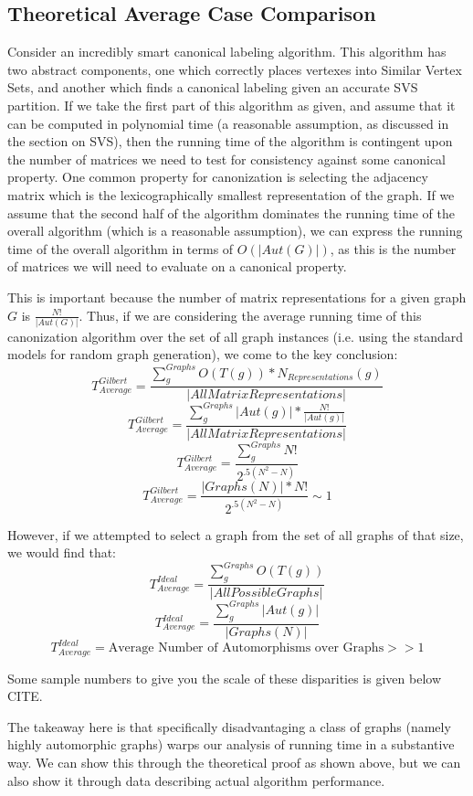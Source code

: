 \documentclass[11pt,a4paper]{report}
\begin{document}
\subsection{Theoretical Average Case Comparison}

Consider an incredibly smart canonical labeling algorithm.
This algorithm has two abstract components, one which correctly places vertexes into Similar Vertex Sets, and another which finds a canonical labeling given an accurate SVS partition.
If we take the first part of this algorithm as given, and assume that it can be computed in polynomial time (a reasonable assumption, as discussed in the section on SVS), then the running time of the algorithm is contingent upon the number of matrices we need to test for consistency against some canonical property.
One common property for canonization is selecting the adjacency matrix which is the lexicographically smallest representation of the graph.
If we assume that the second half of the algorithm dominates the running time of the overall algorithm (which is a reasonable assumption), we can express the running time of the overall algorithm in terms of $O(|Aut(G)|)$, as this is the number of matrices we will need to evaluate on a canonical property.

This is important because the number of matrix representations for a given graph $G$ is $\frac{N!}{|Aut(G)|}$.
Thus, if we are considering the average running time of this canonization algorithm over the set of all graph instances (i.e. using the standard models for random graph generation), we come to the key conclusion:
$$T_{Average}^{Gilbert} = \frac{ \sum^{Graphs}_{g} O(T(g)) * N_{Representations}(g)}{|All Matrix Representations|}$$
$$T_{Average}^{Gilbert} = \frac{ \sum^{Graphs}_{g} |Aut(g)| * \frac{N!}{|Aut(g)|}}{|All Matrix Representations|}$$
$$T_{Average}^{Gilbert} = \frac{ \sum^{Graphs}_{g} N!}{2^{.5(N^2 - N)}}$$
$$T_{Average}^{Gilbert} = \frac{ |Graphs(N)| * N!}{2^{.5(N^2 - N)}} \sim 1$$

However, if we attempted to select a graph from the set of all graphs of that size, we would find that: 
$$T_{Average}^{Ideal} = \frac{ \sum^{Graphs}_{g} O(T(g)) }{|All Possible Graphs|}$$
$$T_{Average}^{Ideal} = \frac{ \sum^{Graphs}_{g} |Aut(g)|}{|Graphs(N)|}$$
$$T_{Average}^{Ideal} = \text{Average Number of Automorphisms over Graphs} >> 1$$

Some sample numbers to give you the scale of these disparities is given below CITE.

The takeaway here is that specifically disadvantaging a class of graphs (namely highly automorphic graphs) warps our analysis of running time in a substantive way.
We can show this through the theoretical proof as shown above, but we can also show it through data describing actual algorithm performance.
\end{document}
